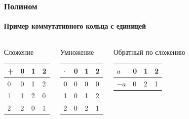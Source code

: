 \begin{frame}
    \frametitle{Полином}
    \framesubtitle{Пример коммутативного кольца с единицей}
    
    \begin{columns}
        \begin{block}{Сложение}
            \begin{table}[ht]
                \label{t:fieldAddTripl}
                \centering
                \begin{tabular}[c]{|l||l|l|l|}
                    \hline
                    +& 0& 1& 2\\ \hline\hline 
                    0& 0& 1& 2\\ \hline 
                    1& 1& 2& 0\\ \hline 
                    2& 2& 0& 1\\ \hline 
                \end{tabular}
            \end{table}
        \end{block}
        
        \begin{block}{Умножение}
            \begin{table}[ht]
                \label{t:fieldMulTripl}
                \centering
                \begin{tabular}[c]{|l||l|l|l|}
                    \hline
                    $\cdot$ & 0& 1& 2\\ \hline\hline 
                    0       & 0& 0& 0\\ \hline 
                    1       & 0& 1& 2\\ \hline 
                    2       & 0& 2& 1\\ \hline 
                \end{tabular}
            \end{table}
        \end{block}
        
        \begin{block}{Обратный по сложению}
            \begin{table}[ht]
                \label{t:fieldNegTripl}
                \centering
                \begin{tabular}[c]{|l|l|l|l|}
                    \hline
                    $a$  & 0& 1& 2\\ \hline\hline 
                    $-a$ & 0& 2& 1\\ \hline 
                \end{tabular}
            \end{table}
        \end{block}        
    \end{columns}
    
    
\end{frame}



